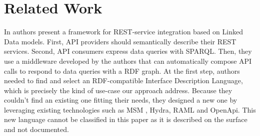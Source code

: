 \section{Related Work}




In \cite{serrano2017linked} authors present a framework for REST-service integration based on Linked Data models. First, API providers should semantically describe their REST services. Second, API consumers express data queries with SPARQL. Then, they use a middleware developed by the authors that can automatically compose API calls to respond to data queries with a RDF graph.
At the first step, authors needed to find and select an RDF-compatible Interface Description Language, which is precisely the kind of use-case our approach address. Because they couldn't find an existing one fitting their needs, they designed a new one by leveraging existing technologies such as MSM \cite{pedrinaci2010toward}, Hydra, RAML and OpenApi. This new language cannot be classified in this paper as it is described on the surface and not documented.